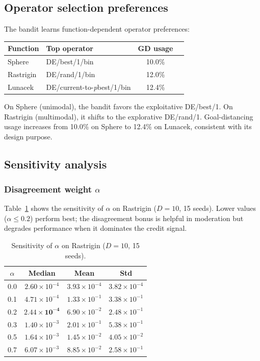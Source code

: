 \documentclass[preprint,12pt,authoryear]{elsarticle}
\begin{document}
\subsection{Operator selection preferences}

The bandit learns function-dependent operator preferences:

\begin{center}
\begin{tabular}{llcc}
\toprule
Function & Top operator & GD usage \\
\midrule
Sphere & DE/best/1/bin & 10.0\% \\
Rastrigin & DE/rand/1/bin & 12.0\% \\
Lunacek & DE/current-to-\emph{p}best/1/bin & 12.4\% \\
\bottomrule
\end{tabular}
\end{center}

On Sphere (unimodal), the bandit favors the exploitative DE/best/1. On Rastrigin (multimodal), it shifts to the explorative DE/rand/1. Goal-distancing usage increases from 10.0\% on Sphere to 12.4\% on Lunacek, consistent with its design purpose.

\subsection{Sensitivity analysis}
\label{sec:sensitivity}

\subsubsection{Disagreement weight $\alpha$}

Table~\ref{tab:alpha} shows the sensitivity of $\alpha$ on Rastrigin ($D = 10$, 15 seeds). Lower values ($\alpha \leq 0.2$) perform best; the disagreement bonus is helpful in moderation but degrades performance when it dominates the credit signal.

\begin{table}[h]
\centering
\caption{Sensitivity of $\alpha$ on Rastrigin ($D = 10$, 15 seeds).}
\label{tab:alpha}
\begin{tabular}{cccc}
\toprule
$\alpha$ & Median & Mean & Std \\
\midrule
0.0 & $2.60 \times 10^{-4}$ & $3.93 \times 10^{-4}$ & $3.82 \times 10^{-4}$ \\
0.1 & $4.71 \times 10^{-4}$ & $1.33 \times 10^{-1}$ & $3.38 \times 10^{-1}$ \\
0.2 & $\mathbf{2.44 \times 10^{-4}}$ & $6.90 \times 10^{-2}$ & $2.48 \times 10^{-1}$ \\
0.3 & $1.40 \times 10^{-3}$ & $2.01 \times 10^{-1}$ & $5.38 \times 10^{-1}$ \\
0.5 & $1.64 \times 10^{-3}$ & $1.45 \times 10^{-2}$ & $4.05 \times 10^{-2}$ \\
0.7 & $6.07 \times 10^{-3}$ & $8.85 \times 10^{-2}$ & $2.58 \times 10^{-1}$ \\
\bottomrule
\end{tabular}
\end{table}
\end{document}
